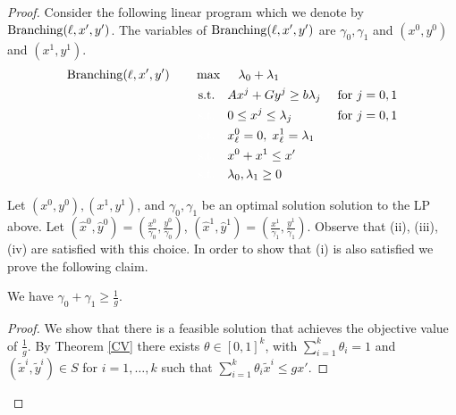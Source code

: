 \begin{proof} 
	Consider the following linear program which we denote by $\operatorname{Branching}(\ell,x',y')$. The variables of $\operatorname{Branching}(\ell,x',y')$ are $\gamma_0,\gamma_1$ and $(x^0,y^0)$ and $(x^1,y^1)$. 
	\begin{align}
		\LPC(\ell,x',y')\quad\quad& \max\quad \;\lambda_0+\lambda_1\\
		&\;\text{s.t.} \quad Ax^j + Gy^j\geq b\lambda_j & \mbox{ for $j=0,1$} \label{feasibility}\\
		&\;{\color{white}{\text{s.t.}} }\quad 0 \leq x^j \leq \lambda_j &\mbox{ for $j=0,1$}\label{bound}\\
		&\;{\color{white}{\text{s.t.}} }\quad x^0_\ell = 0,\; x^1_\ell =\lambda_1\label{branchcoordinate}\\
		&\;{\color{white}{\text{s.t.}} }\quad x^0 + x^1 \leq x'\label{packing}\\
		&\;{\color{white}{\text{s.t.}} }\quad \lambda_0,\lambda_1 \geq 0
	\end{align}
	
	Let $(x^0,y^0),(x^1,y^1)$, and $\gamma_0,\gamma_1$ be an optimal solution solution to the LP above. Let $(\hat{x}^0,\hat{y}^0) = (\frac{x^0}{\gamma_0},\frac{y^0}{\gamma_0})$, $(\hat{x}^1,\hat{y}^1) = (\frac{x^1}{\gamma_1},\frac{y^1}{\gamma_1})$. Observe that  (ii), (iii), (iv) are satisfied with this choice. In order to show that (i) is also satisfied we prove the following claim.
	
	\begin{claim}\label{CVexists}
		We have $\gamma_0 + \gamma_1\geq \frac{1}{g}$.
	\end{claim}
	\begin{proof}
		We show that there is a feasible solution that achieves the objective value of $\frac{1}{g}$. By Theorem \ref{CV} there exists $\theta \in [0,1]^k$, with $\sum_{i=1}^{k}\theta_i = 1$ and $(\tilde{x}^i,\tilde{y}^i)\in S$ for $i=1,\ldots,k$ such that 
		$\sum_{i=1}^{k}\theta_i \tilde{x}^i\leq gx'$. 
		

\end{proof}
\end{proof}
